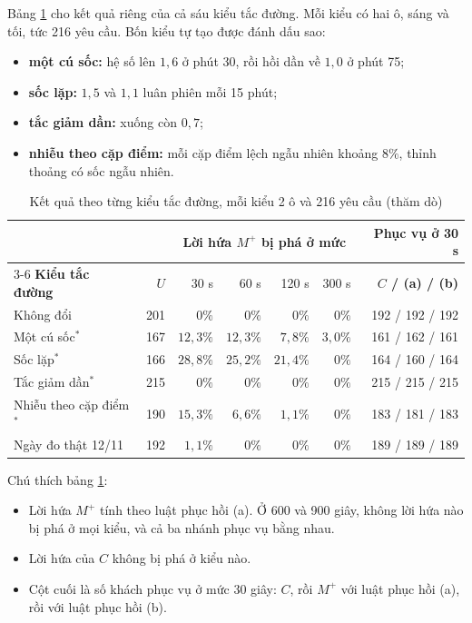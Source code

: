 Bảng \ref{bang:quet-kieu} cho kết quả riêng của cả sáu kiểu tắc đường. Mỗi kiểu có hai ô, sáng và tối,
tức 216 yêu cầu. Bốn kiểu tự tạo được đánh dấu sao:
\begin{itemize}
\item \textbf{một cú sốc:} hệ số lên $1{,}6$ ở phút 30, rồi hồi dần về $1{,}0$ ở phút 75;
\item \textbf{sốc lặp:} $1{,}5$ và $1{,}1$ luân phiên mỗi 15 phút;
\item \textbf{tắc giảm dần:} xuống còn $0{,}7$;
\item \textbf{nhiễu theo cặp điểm:} mỗi cặp điểm lệch ngẫu nhiên khoảng $8\%$, thỉnh thoảng có sốc ngẫu nhiên.
\end{itemize}

\begin{table}[htbp]
\centering
\caption{Kết quả theo từng kiểu tắc đường, mỗi kiểu 2 ô và 216 yêu cầu (thăm dò)}
\label{bang:quet-kieu}
\small
\begin{tabular}{@{}lrrrrrr@{}}
\toprule
& & \multicolumn{4}{c}{\textbf{Lời hứa $M^{+}$ bị phá ở mức}} & \textbf{Phục vụ ở 30 s}\\
\cmidrule(lr){3-6}
\textbf{Kiểu tắc đường} & \textbf{$U$} & 30 s & 60 s & 120 s & 300 s & \textbf{$C$ / (a) / (b)}\\
\midrule
Không đổi & 201 & $0\%$ & $0\%$ & $0\%$ & $0\%$ & 192 / 192 / 192\\
Một cú sốc$^{*}$ & 167 & $12{,}3\%$ & $12{,}3\%$ & $7{,}8\%$ & $3{,}0\%$ & 161 / 162 / 161\\
Sốc lặp$^{*}$ & 166 & $28{,}8\%$ & $25{,}2\%$ & $21{,}4\%$ & $0\%$ & 164 / 160 / 164\\
Tắc giảm dần$^{*}$ & 215 & $0\%$ & $0\%$ & $0\%$ & $0\%$ & 215 / 215 / 215\\
Nhiễu theo cặp điểm$^{*}$ & 190 & $15{,}3\%$ & $6{,}6\%$ & $1{,}1\%$ & $0\%$ & 183 / 181 / 183\\
Ngày đo thật 12/11 & 192 & $1{,}1\%$ & $0\%$ & $0\%$ & $0\%$ & 189 / 189 / 189\\
\bottomrule
\end{tabular}
\end{table}

Chú thích bảng \ref{bang:quet-kieu}:
\begin{itemize}
\item Lời hứa $M^{+}$ tính theo luật phục hồi (a). Ở 600 và 900 giây, không lời hứa nào bị phá ở mọi kiểu,
và cả ba nhánh phục vụ bằng nhau.
\item Lời hứa của $C$ không bị phá ở kiểu nào.
\item Cột cuối là số khách phục vụ ở mức 30 giây: $C$, rồi $M^{+}$ với luật phục hồi (a), rồi với luật
phục hồi (b).
\end{itemize}

